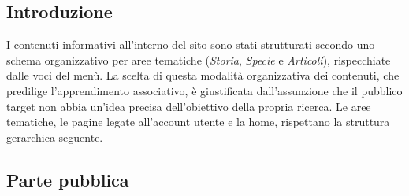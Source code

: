 \documentclass[12pt]{article}
\begin{document}
	\subsection{Introduzione}
	
	I contenuti informativi all'interno del sito sono stati strutturati secondo uno schema organizzativo per aree tematiche (\textit{Storia}, \textit{Specie} e \textit{Articoli}), rispecchiate dalle voci del menù. La scelta di questa modalità organizzativa dei contenuti, che predilige l'apprendimento associativo, è giustificata dall'assunzione che il pubblico target non abbia un'idea precisa dell'obiettivo della propria ricerca. Le aree tematiche, le pagine legate all'account utente e la home, rispettano la struttura gerarchica seguente.
	
	\subsection{Parte pubblica}
	
\end{document}
